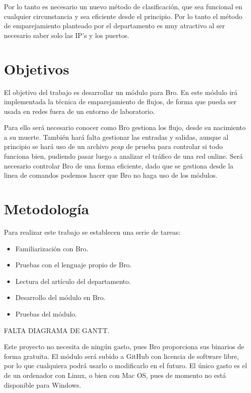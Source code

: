 \intro Por lo tanto es necesario un nuevo método de clasificación, que sea funcional en cualquier circunstancia 
y sea eficiente desde el principio. Por lo tanto el método de emparejamiento planteado por el departamento es 
muy atractivo al ser necesario saber solo las IP's y los puertos. \cite{comparacion}

\section{Objetivos}

El objetivo del trabajo es desarrollar un módulo para Bro. En este módulo irá implementada la técnica de emparejamiento de flujos, de forma que pueda ser usada en redes fuera de un entorno de laboratorio.

\intro Para ello será necesario conocer como Bro gestiona los flujo, desde su nacimiento a su muerte. 
\intro También hará falta gestionar las entradas y salidas, aunque al principio se hará uso de un 
archivo \textit{pcap} de prueba para controlar si todo funciona bien, 
pudiendo pasar luego a analizar el tráfico de una red online.
\intro Será necesario controlar Bro de una forma eficiente, dado que se gestiona desde la linea de comandos 
podemos hacer que Bro no haga uso de los módulos.


\section{Metodología}

Para realizar este trabajo se establecen una serie de tareas:

\begin{itemize}
\item Familiarización con Bro.
\item Pruebas con el lenguaje propio de Bro.
\item Lectura del artículo del departamento. \cite{comparacion}
\item Desarrollo del módulo en Bro.
\item Pruebas del módulo.
\end{itemize}


FALTA DIAGRAMA DE GANTT.

\intro Este proyecto no necesita de ningún gasto, pues Bro \cite{broindex} proporciona sus binarios de 
forma gratuita. El módulo será subido a GitHub con licencia de software libre, por lo que cualquiera 
podrá usarlo o modificarlo en el futuro. El único gasto es el de un ordenador con Linux, o bien con Mac OS, 
pues de momento no está disponible para Windows. \cite{brodownload}


